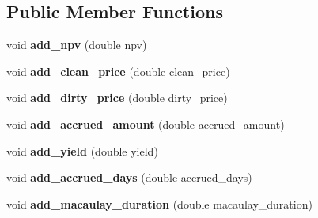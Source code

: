 \subsection*{Public Member Functions}
\begin{DoxyCompactItemize}
\item 
\mbox{\label{structquantra_1_1FixedRateBondResponseBuilder_a99320927862d6f204f37d5b95c64f9c2}} 
void {\bfseries add\+\_\+npv} (double npv)
\item 
\mbox{\label{structquantra_1_1FixedRateBondResponseBuilder_a2e2d9376f4a0330d83bea620817e7221}} 
void {\bfseries add\+\_\+clean\+\_\+price} (double clean\+\_\+price)
\item 
\mbox{\label{structquantra_1_1FixedRateBondResponseBuilder_a0b73a7ec559087f4bd63502fffbaa9bb}} 
void {\bfseries add\+\_\+dirty\+\_\+price} (double dirty\+\_\+price)
\item 
\mbox{\label{structquantra_1_1FixedRateBondResponseBuilder_aca3203d7591be4b6870bfbbaaea64d10}} 
void {\bfseries add\+\_\+accrued\+\_\+amount} (double accrued\+\_\+amount)
\item 
\mbox{\label{structquantra_1_1FixedRateBondResponseBuilder_a4cfbef559b5859b3c1aa140ed1ddeee1}} 
void {\bfseries add\+\_\+yield} (double yield)
\item 
\mbox{\label{structquantra_1_1FixedRateBondResponseBuilder_a0c73e0b1a225612427b1c0fd0ae762ef}} 
void {\bfseries add\+\_\+accrued\+\_\+days} (double accrued\+\_\+days)
\item 
\mbox{\label{structquantra_1_1FixedRateBondResponseBuilder_a44e122311b2dd052e558fba65642bc79}} 
void {\bfseries add\+\_\+macaulay\+\_\+duration} (double macaulay\+\_\+duration)
\item 
\mbox{\label{structquantra_1_1FixedRateBondResponseBuilder_a3078638f6ac639f6fa3b952936420fd2}} 

\end{DoxyCompactItemize}
